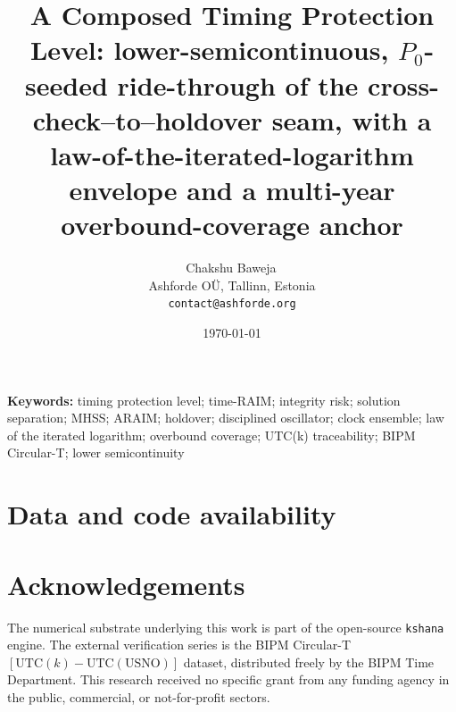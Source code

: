 \documentclass[11pt]{article}
\title{\textbf{A Composed Timing Protection Level: lower-semicontinuous,
$P_0$-seeded ride-through of the cross-check--to--holdover seam, with a
law-of-the-iterated-logarithm envelope and a multi-year overbound-coverage
anchor}}
\author{Chakshu Baweja\,\orcidlink{0009-0008-2098-0751}\\
\small Ashforde O\"U, Tallinn, Estonia \\
\small \texttt{contact@ashforde.org}}
\date{\today}
\theoremstyle{definition}
\newcommand{\code}[1]{\texttt{#1}}
\newcommand{\utck}{\mathrm{UTC}(k)}               %
\begin{document}
\maketitle

\begin{abstract}

\end{abstract}

\noindent\textbf{Keywords:} timing protection level; time-RAIM; integrity risk;
solution separation; MHSS; ARAIM; holdover; disciplined oscillator; clock
ensemble; law of the iterated logarithm; overbound coverage; UTC(k)
traceability; BIPM Circular-T; lower semicontinuity

\vspace{0.5em}










\section*{Data and code availability}


\section*{Acknowledgements}
The numerical substrate underlying this work is part of the open-source
\code{kshana} engine. The external verification series is the BIPM Circular-T
$[\utck{}-\mathrm{UTC(USNO)}]$ dataset, distributed freely by the BIPM Time
Department. This research received no specific grant from any funding agency in
the public, commercial, or not-for-profit sectors.




\appendix

\end{document}
